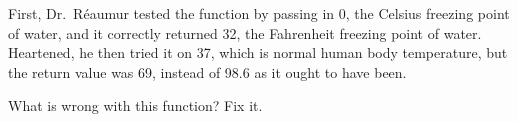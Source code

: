 First, Dr.~R\'eaumur tested the function by passing in 0, the Celsius
freezing point of water, and it correctly returned 32, the Fahrenheit
freezing point of water.  Heartened, he then tried it on 37, which is
normal human body temperature, but the return value was 69, instead of
98.6 as it ought to have been.

What is wrong with this function?  Fix it.



